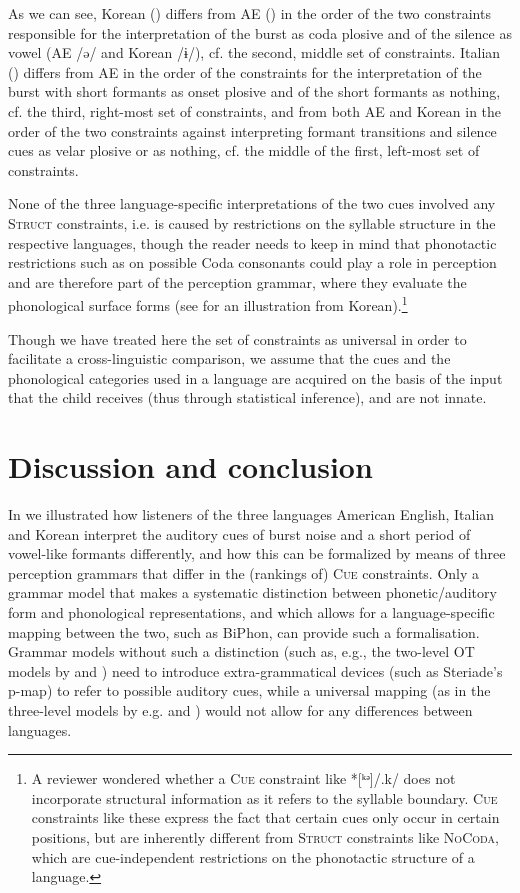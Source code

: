 \documentclass[output=paper,colorlinks,citecolor=brown]{langscibook}
\begin{document}
As we can see, Korean () differs from AE () in the order of the two constraints responsible for the interpretation of the burst as coda plosive and of the silence as vowel (AE /ə/ and Korean /ɨ/), cf. the second, middle set of constraints. Italian () differs from AE in the order of the constraints for the interpretation of the burst with short formants as onset plosive and of the short formants as nothing, cf. the third, right-most set of constraints, and from both AE and Korean in the order of the two constraints against interpreting formant transitions and silence cues as velar plosive or as nothing, cf. the middle of the first, left-most set of constraints.

None of the three language-specific interpretations of the two cues involved any S\textsc{truct} constraints, i.e. is caused by restrictions on the syllable structure in the respective languages, though the reader needs to keep in mind that phonotactic restrictions such as on possible Coda consonants could play a role in perception and are therefore part of the perception grammar, where they evaluate the phonological surface forms (see \cite{BoersmaHamann2009} for an illustration from Korean).\footnote{A reviewer wondered whether a C\textsc{ue} constraint like *[ᵏᵊ]/.k/ does not incorporate structural information as it refers to the syllable boundary. C\textsc{ue} constraints like these express the fact that certain cues only occur in certain positions, but are inherently different from S\textsc{truct} constraints like N\textsc{o}C\textsc{oda}, which are cue-independent restrictions on the phonotactic structure of a language.}

Though we have treated here the set of constraints as universal in order to facilitate a cross-linguistic comparison, we assume that the cues and the phonological categories used in a language are acquired on the basis of the input that the child receives (thus through statistical inference), and are not innate.

\section{Discussion and conclusion}\label{hamann:conc}

In  we illustrated how listeners of the three languages American English, Italian and Korean interpret the auditory cues of burst noise and a short period of vowel-like formants differently, and how this can be formalized by means of three perception grammars that differ in the (rankings of) C\textsc{ue} constraints. Only a grammar model that makes a systematic distinction between phonetic/auditory form and phonological representations, and which allows for a language-specific mapping between the two, such as BiPhon, can provide such a formalisation. Grammar models without such a distinction (such as, e.g., the two-level OT models by \cite{Flemming2001} and \cite{Steriade2001}) need to introduce extra-grammatical devices (such as Steriade's p-map) to refer to possible auditory cues, while a universal mapping (as in the three-level models by e.g. \cite{HaleKissock2007} and \cite{HaleReiss2000}) would not allow for any differences between languages.
\end{document}
